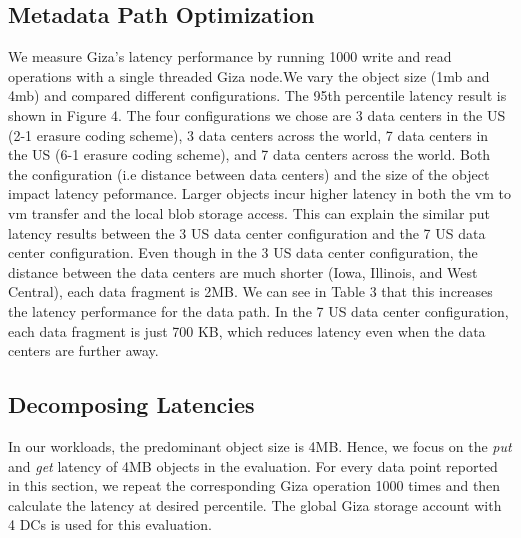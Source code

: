 \subsection{Metadata Path Optimization}
We measure Giza's latency performance by running 1000 write and read operations with a single threaded Giza node.We vary the object size (1mb and 4mb) and compared different configurations. 
The 95th percentile latency result is shown in Figure 4. The four configurations we chose are 3 data centers in the US (2-1 erasure coding scheme), 3 data centers across the world, 7 data centers in the US (6-1 erasure coding scheme), and 7 data centers across the world. Both the configuration (i.e distance between data centers) and the size of the object impact latency peformance. Larger objects incur higher latency in both the vm to vm transfer and the local blob storage access. This can explain the similar put latency results between the 3 US data center configuration and the 7 US data center configuration. Even though in the 3 US data center configuration, the distance between the data centers are much shorter (Iowa, Illinois, and West Central), each data fragment is 2MB. We can see in Table 3 that this increases the latency performance for the data path. In the 7 US data center configuration, each data fragment is just 700 KB, which reduces latency even when the data centers are further away. 



\subsection{Decomposing \name Latencies}

In our workloads, the predominant object size is 4MB. Hence, we focus on the {\em put} and {\em get} latency of 4MB objects in the evaluation. For every data point reported in this section, we repeat the corresponding Giza operation 1000 times and then calculate the latency at desired percentile. The global Giza storage account with 4 DCs is used for this evaluation.


